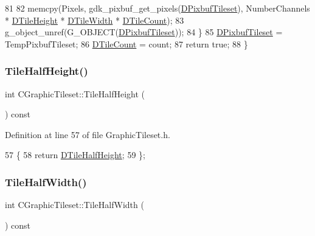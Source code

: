 \begin{DoxyCode}
81         
82         memcpy(Pixels, gdk\_pixbuf\_get\_pixels(\hyperlink{classCGraphicTileset_a5d5adfcdbb347a6df3f57535ca08e3ef}{DPixbufTileset}), NumberChannels * 
      \hyperlink{classCGraphicTileset_af48f32e07d5fe69afd5f764318cc3244}{DTileHeight} * \hyperlink{classCGraphicTileset_a2d0c7d19865b81911a3a43d5cae50e00}{DTileWidth} * \hyperlink{classCGraphicTileset_a39d942b370e47f441bf97385eb1037c8}{DTileCount});
83         g\_object\_unref(G\_OBJECT(\hyperlink{classCGraphicTileset_a5d5adfcdbb347a6df3f57535ca08e3ef}{DPixbufTileset}));
84     \}
85     \hyperlink{classCGraphicTileset_a5d5adfcdbb347a6df3f57535ca08e3ef}{DPixbufTileset} = TempPixbufTileset;
86     \hyperlink{classCGraphicTileset_a39d942b370e47f441bf97385eb1037c8}{DTileCount} = count;
87     \textcolor{keywordflow}{return} \textcolor{keyword}{true};
88 \}
\end{DoxyCode}
\hypertarget{classCGraphicTileset_a958562733d2ac30643188503e774af32}{}\label{classCGraphicTileset_a958562733d2ac30643188503e774af32} 
\subsubsection{\texorpdfstring{Tile\+Half\+Height()}{TileHalfHeight()}}
{\footnotesize\ttfamily int C\+Graphic\+Tileset\+::\+Tile\+Half\+Height (\begin{DoxyParamCaption}{ }\end{DoxyParamCaption}) const\hspace{0.3cm}{\ttfamily [inline]}}



Definition at line 57 of file Graphic\+Tileset.\+h.


\begin{DoxyCode}
57                                   \{
58             \textcolor{keywordflow}{return} \hyperlink{classCGraphicTileset_a16c8bc4e4c8738fe561b0408cd40ccef}{DTileHalfHeight};
59         \};
\end{DoxyCode}
\hypertarget{classCGraphicTileset_aa34a25f396f9684aebc5f73c45356ea5}{}\label{classCGraphicTileset_aa34a25f396f9684aebc5f73c45356ea5} 
\subsubsection{\texorpdfstring{Tile\+Half\+Width()}{TileHalfWidth()}}
{\footnotesize\ttfamily int C\+Graphic\+Tileset\+::\+Tile\+Half\+Width (\begin{DoxyParamCaption}{ }\end{DoxyParamCaption}) const\hspace{0.3cm}{\ttfamily [inline]}}



